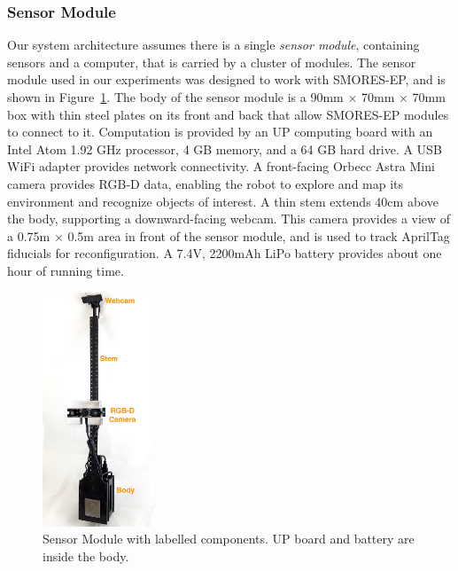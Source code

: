 \documentclass[journal]{IEEEtran}
\begin{document}
\subsubsection{Sensor Module} %
\label{sec:sensor_module}
%
Our system architecture assumes there is a single \textit{sensor module}, containing sensors and a computer, that is carried by a cluster of modules.
The sensor module used in our experiments was designed to work with SMORES-EP, and is shown in Figure~\ref{fig:sensor-module}.
The body of the sensor module is a 90mm $\times$ 70mm $\times$ 70mm box with thin steel plates on its front and back that allow SMORES-EP modules
to connect to it.
Computation is provided by an UP computing board with an Intel Atom 1.92 GHz
processor, 4 GB memory, and a 64 GB hard drive. A USB WiFi adapter provides
network connectivity. A front-facing Orbecc Astra Mini camera provides RGB-D
data, enabling the robot to explore and map its environment and recognize
objects of interest.  A thin stem extends 40cm above the body, supporting a
downward-facing webcam. This camera provides a view of a  0.75m $\times$ 0.5m area
in front of the sensor module, and is used to track AprilTag
\cite{olson2011apriltag} fiducials for reconfiguration. A 7.4V, 2200mAh LiPo
battery provides about one hour of running time.
%
\begin{figure}
\begin{center}
\includegraphics[width=0.3\textwidth]{images/sensor_module_new_labelled.jpg}
\caption{Sensor Module with labelled components.  UP board and battery are inside the body.}
\label{fig:sensor-module}
\end{center}
\vspace{-2em}
\end{figure}
%
\end{document}
